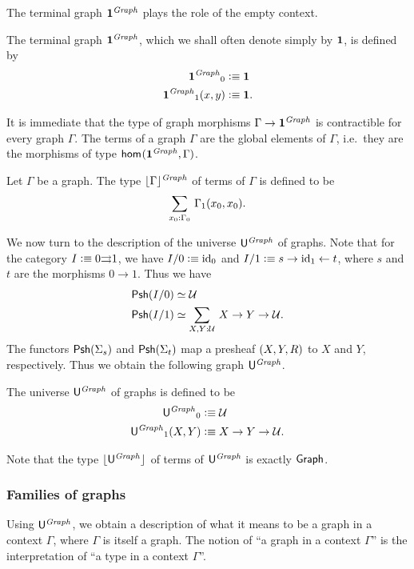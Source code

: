 The terminal graph $\unit^\mfGraph$ plays the role of the empty context.

\begin{defn}
The terminal graph $\unit^\mfGraph$, which we shall often denote simply 
by $\unit$, is defined by
\begin{align*}
{\unit^\mfGraph}_0 & \defeq \unit\\
{\unit^\mfGraph}_1(x,y) & \defeq \unit.
\end{align*}
\end{defn}

It is immediate that the type of graph morphisms $\Gamma\to\unit^\mfGraph$ is
contractible for every graph $\Gamma$. The terms of a graph $\Gamma$ are the
global elements of $\Gamma$, i.e.~they are the morphisms of type 
$\ctxhom{\unit^\mfGraph}{\Gamma}$.

\begin{defn}
Let $\Gamma$ be a graph. The type $\terms[\mfGraph]{\Gamma}$ of terms of $\Gamma$ is
defined to be
\begin{equation*}
\sm{x_0:\Gamma_0}\Gamma_1(x_0,x_0).
\end{equation*}
\end{defn}

We now turn to the description of the universe $\gobjclass$ of graphs. Note
that for the category $I\defeq 0{\rightrightarrows}1$, we have
$I/0\defeq\catid{0}$ and $I/1\defeq s\rightarrow\catid{1}\leftarrow t$, where
$s$ and $t$ are the morphisms $0\to 1$. Thus we have 
\begin{align*}
\psh(I/0) & \eqvsym \type\\
\psh(I/1) & \eqvsym \sm{X,Y:\type}X\to Y\to\type.
\end{align*}
The functors $\psh(\Sigma_s)$ and $\psh(\Sigma_t)$ map a presheaf 
$\pairr{X,Y,R}$ to $X$ and $Y$, respectively. 
Thus we obtain the following graph $\gobjclass$.

\begin{defn}
The universe $\gobjclass$ of graphs is defined to be
\begin{align*}
{\gobjclass}_0 & \defeq \type\\
{\gobjclass}_1(X,Y) & \defeq X\to Y\to\type.
\end{align*}
\end{defn}

Note that the type $\terms{\gobjclass}$ of terms of $\gobjclass$ is 
exactly $\tfGraph$. 

\subsubsection{Families of graphs}
Using $\gobjclass$, we obtain a description of what
it means to be a graph in a context $\Gamma$, where $\Gamma$ is itself a
graph. The notion of ``a graph in a context $\Gamma$'' is the interpretation
of ``a type in a context $\Gamma$''.

